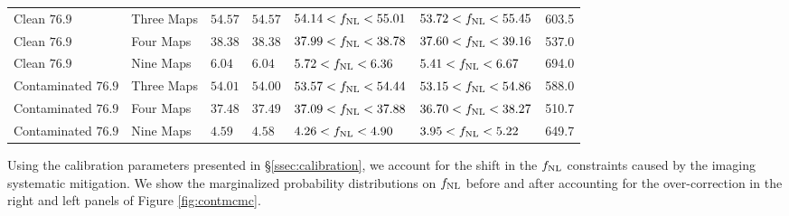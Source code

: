 \begin{table}
{\begin{tabular}{lllllll}
Clean $76.9$ & Three Maps              & $ 54.57$& $ 54.57$& $ 54.14<f_{\rm NL}< 55.01$& $ 53.72<f_{\rm NL}< 55.45$ &  603.5\\
Clean $76.9$ & Four Maps               & $ 38.38$& $ 38.38$& $ 37.99<f_{\rm NL}< 38.78$& $ 37.60<f_{\rm NL}< 39.16$ &  537.0\\
Clean $76.9$ & Nine Maps               & $  6.04$& $  6.04$& $  5.72<f_{\rm NL}<  6.36$& $  5.41<f_{\rm NL}<  6.67$ &  694.0\\
Contaminated $76.9$ & Three Maps       & $ 54.01$& $ 54.00$& $ 53.57<f_{\rm NL}< 54.44$& $ 53.15<f_{\rm NL}< 54.86$ &  588.0\\
Contaminated $76.9$ & Four Maps        & $ 37.48$& $ 37.49$& $ 37.09<f_{\rm NL}< 37.88$& $ 36.70<f_{\rm NL}< 38.27$ &  510.7\\
Contaminated $76.9$ & Nine Maps        & $  4.59$& $  4.58$& $  4.26<f_{\rm NL}<  4.90$& $  3.95<f_{\rm NL}<  5.22$ &  649.7\\
\hline
    \end{tabular}
    }
\end{table}
Using the calibration parameters presented in \S \ref{ssec:calibration}, we account for the shift in the $f_{\rm NL}$ constraints caused by the imaging systematic mitigation. We show the marginalized probability distributions on $f_{\rm NL}$ before and after accounting for the over-correction in the right and left panels of Figure \ref{fig:contmcmc}.

